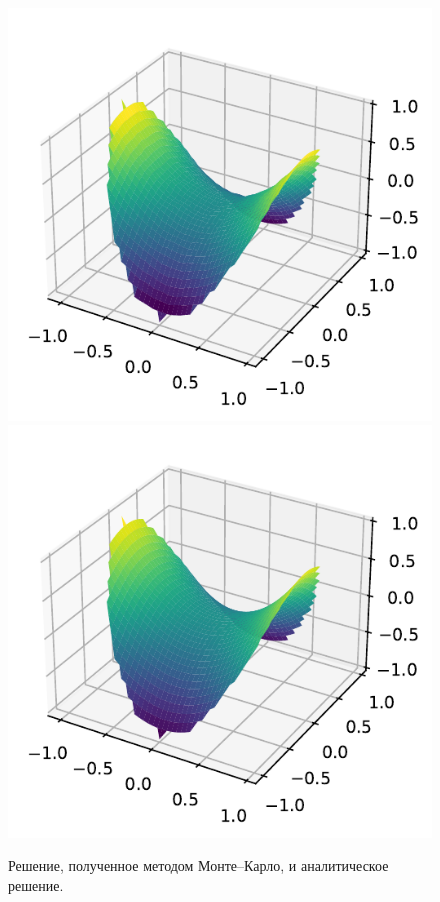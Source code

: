 \documentclass[16pt]{article}
\begin{document}
\begin{figure}[h]
	\center
	\includegraphics[scale=0.7]{8_1.pdf}
	\hfill
	\includegraphics[scale=0.7]{8_2.pdf}
	\caption{Решение, полученное методом Монте--Карло, и аналитическое решение.}
\end{figure}
\end{document}
